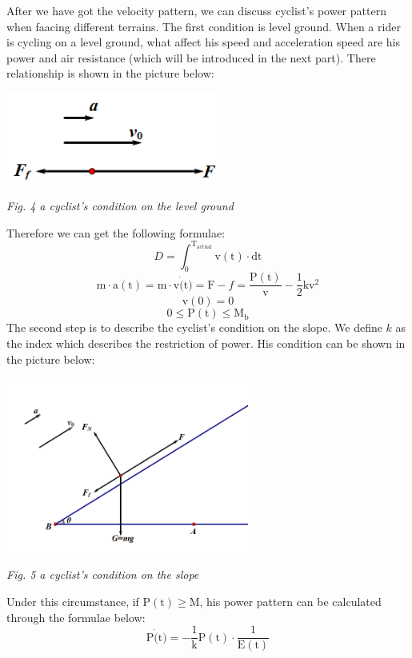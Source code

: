 \documentclass{article}
\begin{document}
	After we have got the velocity pattern, we can discuss cyclist's power pattern when faacing different terrains. The first condition is level ground. When a rider is cycling on a level ground, what affect his speed and acceleration speed are his power and air resistance (which will be introduced in the next part). There relationship is shown in the picture below:
	\begin{center}
		\includegraphics[height=3cm]{4.png}

		\small \textit{Fig. 4 a cyclist's condition on the level ground}
	\end{center}
	 Therefore we can get the following formulae:
	$$D=\int^{\mathrm{T}_\mathrm{actual}}_0 \mathrm{v}(\mathrm{t})\cdot \mathrm{dt}$$
	$$\mathrm{m} \cdot \mathrm{a}(\mathrm{t})=\mathrm{m} \cdot \mathrm{v}\dot(\mathrm{t})=\mathrm{F}-f=\dfrac{\mathrm{P}(\mathrm{t})}{\mathrm{v}}-\dfrac{1}{2}\mathrm{k}\mathrm{v}^2$$
	$$\mathrm{v}(0)=0$$
	$$0\leq\mathrm{P}(\mathrm{t})\leq\mathrm{M}_\mathrm{b}$$
	The second step is to describe the cyclist's condition on the slope. We define $k$ as the index which describes the restriction of power. His condition can be shown in the picture below:
	\begin{center}
		\includegraphics[width=8cm]{5.png}

		\small \textit{Fig. 5 a cyclist's condition on the slope}
	\end{center}
	Under this circumstance, if $\mathrm{P}(\mathrm{t}) \ge \mathrm{M}$, his power pattern can be calculated through the formulae below:
	$$\mathrm{P}\dot(\mathrm{t})=-\dfrac{1}{\mathrm{k}} \mathrm{P}(\mathrm{t}) \cdot \dfrac{1}{\mathrm{E}(\mathrm{t})}$$
\end{document}
